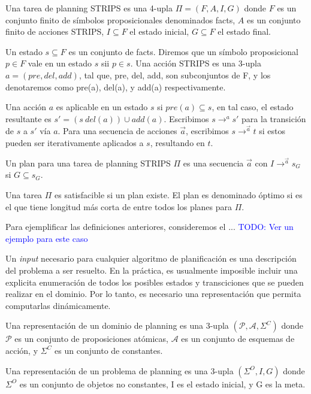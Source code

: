 \begin{mydef}
    Una tarea de planning STRIPS es una 4-upla $\Pi = (F, A, I, G)$ donde $F$ es
    un conjunto finito de símbolos proposicionales denominados facts, $A$ es un
    conjunto finito de acciones STRIPS, $I \subseteq F$ el estado inicial, $G
    \subseteq F$ el estado final.

    Un estado $s \subseteq F$ es un conjunto de facts. Diremos que un símbolo
    proposicional $p \in F$ vale en un estado $s$ sii $p \in s$. Una acción
    STRIPS es una 3-upla $a = (pre, del, add)$, tal que, pre, del, add, son
    subconjuntos de F, y los denotaremos como pre(a), del(a), y add(a)
    respectivamente.

    Una acción $a$ es aplicable en un estado $s$ si $pre(a) \subseteq s$, en tal
    caso, el estado resultante es $s' = (s \ del(a)) \cup add(a)$. Escribimos $s
    \rightarrow^a s'$ para la transición de $s$ a $s'$ vía $a$. Para una
    secuencia de acciones $\vec{a}$, escribimos $s \rightarrow^{\vec{a}} t$ si
    estos pueden ser iterativamente aplicados a $s$, resultando en $t$.

    Un plan para una tarea de planning STRIPS $\Pi$ es una secuencia $\vec{a}$
    con $I \rightarrow^{\vec{a}} s_G$ si $G \subseteq s_G$.

    Una tarea $\Pi$ es satisfacible si un plan existe. El plan es denominado
    óptimo si es el que tiene longitud más corta de entre todos los planes para
    $\Pi$.
\end{mydef}

Para ejemplificar las definiciones anteriores, consideremos el ...
\textcolor{blue}{TODO: Ver un ejemplo para este caso}


Un \emph{input} necesario para cualquier algoritmo de planificación es una
descripción del problema a ser resuelto. En la práctica, es usualmente imposible
incluir una explicita enumeración de todos los posibles estados y transciciones
que se pueden realizar en el dominio. Por lo tanto, es necesario una
representación que permita computarlas dinámicamente.

\begin{mydef}
    Una representación de un dominio de planning es una 3-upla $(\mathcal{P},
    \mathcal{A}, \Sigma^{C})$ donde $\mathcal{P}$ es un conjunto de
    proposiciones atómicas, $\mathcal{A}$ es un conjunto de esquemas de acción,
    y $\Sigma^{C}$ es un conjunto de constantes.
\end{mydef}

\begin{mydef}
    Una representación de un problema de planning es una 3-upla $(\Sigma^{O}, I,
    G)$ donde $\Sigma^{O}$ es un conjunto de objetos no constantes, I es el estado
    inicial, y G es la meta.
\end{mydef}






